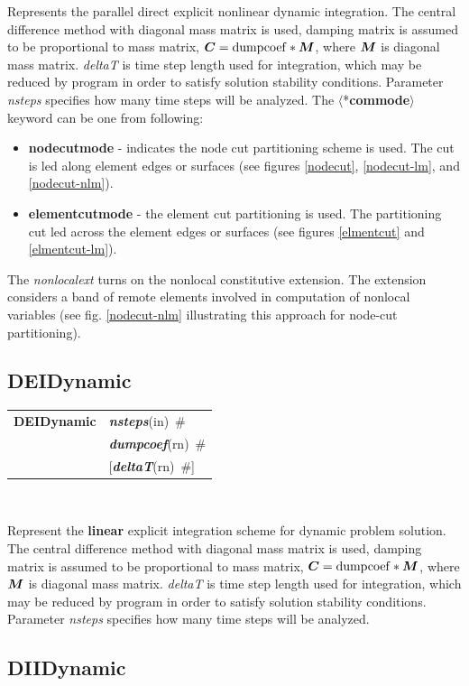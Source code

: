 \documentclass[a4paper]{article}
\makeatletter
\newcommand{\mbf}[1]{\mbox{\boldmath$#1$}}
\newcommand{\param}[1]{{\em #1}}
\newcommand{\keywordnotype}[1]{\mbox{{\it{\bf{#1}}}}}
\newcommand{\keyword}[2]{\mbox{{\keywordnotype{#1}\tiny (#2)}}}
\newcommand{\entKeywordInst}[1]{\mbox{{\bf{{#1}}}}}
\newcommand{\field}[2]{\mbox{\keyword{#1}{#2}~\#}}
\newcommand{\optField}[2]{\mbox{[\field{#1}{#2}]}}
\newcommand{\Pmode}[1]{{\sffamily #1}}
\newcommand{\PentKeyword}[1]{\mbox{{$\langle$*{\bf{#1}}$\rangle$}}}
\newenvironment{record}[1][]{\begin{tabular}{|ll}}{\end{tabular}\\}
\newcommand{\recentry}[2]{{#1}&{#2}\\}
\newcounter{rcc}
\newenvironment{record}[1][\textwidth]{\setcounter{rcc}{0}\begin{tabular*}{#1}{|ll@{\extracolsep{\fill}}r}}{\end{tabular*}\\}
\newcommand{\recentry}[2]{\ifthenelse{\value{rcc}>0}{&$\backslash$ \\}{\setcounter{rcc}{1}}{#1}&{#2}}
\makeatother
\begin{document}
\Pmode{
Represents the parallel direct explicit  nonlinear dynamic  integration.
The central difference method with diagonal mass matrix is used,
damping matrix is assumed to be proportional to mass matrix, $\mbf{C}
= {\rm dumpcoef} * \mbf{M}$, where
$\mbf{M}$ is diagonal mass matrix. \param{deltaT} is time step length used for
integration, which may be reduced by program in order to satisfy
solution stability conditions. Parameter \param{nsteps} specifies
how many time steps will be analyzed.
The \PentKeyword{commode} keyword can be one from following:
\begin{itemize}
\item \entKeywordInst{nodecutmode} - indicates the node cut partitioning scheme is
used. The cut is led along element edges or surfaces (see
figures \ref{nodecut}, \ref{nodecut-lm}, and \ref{nodecut-nlm}).
\item \entKeywordInst{elementcutmode} - the element cut partitioning is used. The
partitioning cut led across the element edges or surfaces (see
figures \ref{elmentcut} and \ref{elmentcut-lm}).
\end{itemize}
\Pmode{
The \param{nonlocalext} turns on the nonlocal constitutive
extension. The extension considers a band of remote elements involved
in computation of nonlocal variables (see fig. \ref{nodecut-nlm} illustrating
this approach for node-cut partitioning).
}
}

\subsection{DEIDynamic}
\label{DEIDynamic}

\begin{record}
\recentry{\entKeywordInst{DEIDynamic}}{\field{nsteps}{in}}
\recentry{}{\field{dumpcoef}{rn}} \recentry{}{\optField{deltaT}{rn}}
\end{record}

Represent the {\bf linear} explicit
integration scheme for dynamic problem solution. The central difference method with diagonal mass matrix is used,
damping matrix is assumed to be proportional to mass matrix, $\mbf{C} = {\rm dumpcoef} * \mbf{M}$, where
$\mbf{M}$ is diagonal mass matrix. \param{deltaT} is time step length used for
integration, which may be reduced by program in order to satisfy
solution stability conditions. Parameter \param{nsteps} specifies
how many time steps will be analyzed.

\subsection{DIIDynamic}
\label{DIIDynamic}
\end{document}
